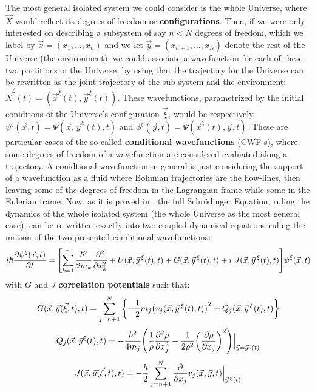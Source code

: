 \documentclass[11pt, a4paper]{article} %
\begin{document}
The most general isolated system we could consider is the whole Universe, where $\vec{X}$ would reflect its degrees of freedom or {\bf configurations}. Then, if we were only interested on describing a subsystem of say $n<N$ degrees of freedom, which we label by $\vec{x}=(x_1,...,x_n)$ and we let $\vec{y}=(x_{n+1},...,x_N)$ denote the rest of the Universe (the environment), we could associate a wavefunction for each of these two partitions of the Universe, by using that the trajectory for the Universe can be rewritten as the joint trajectory of the sub-system and the environment: $\vec{X}^\xi(t)=(\vec{x}^\xi(t), \vec{y}^\xi(t))$. These wavefunctions, parametrized by the initial coniditons of the Universe's configuration $\vec{\xi}$, would be respectively, $\psi^\xi(\vec{x},t)=\Psi(\vec{x},\vec{y}^\xi(t),t)$ and $\phi^\xi(\vec{y},t)=\Psi(\vec{x}^\xi(t),\vec{y},t)$. These are particular cases of the so called {\bf conditional wavefunctions} (CWF-s), where some degrees of freedom of a wavefunction are considered evaluated along a trajectory. A conidtional wavefunction in general is just considering the support of a wavefunction as a fluid where Bohmian trajectories are the flow-lines, then leaving some of the degrees of freedom in the Lagrangian frame while some in the Eulerian frame. Now, as it is proved in \cite{GJ}, the full Schrödinger Equation, ruling the dynamics of the whole isolated system (the whole Universe as the most general case), can be re-written exactly into two coupled dynamical equations ruling the motion of the two presented conditional wavefunctions:
\begin{equation}\label{SE.GJ}
i \hbar \pdv{\psi^\xi (\vec{x},t)}{t} = \qty[\sum_{k=1}^n\frac{\hbar^2}{2m_k} \pdv[2]{}{x_k} +  U(\vec{x}, \vec{y}^{\, \xi}(t),t) + G(\vec{x}, \vec{y}^{\, \xi}(t),t)+i\ J(\vec{x}, \vec{y}^{\, \xi}(t),t)] \psi^\xi (\vec{x},t)
\end{equation}
with $G$ and $J$ {\bf correlation potentials} such that:
\begin{equation}\label{G.Bohm}
G(\vec{x},\vec{y}(\vec{\xi},t),t)=\sum_{j=n+1}^N\qty{-\frac{1}{2}m_j\qty(v_j(\vec{x},\vec{y}^{\, \xi}(t),t))^2+Q_j(\vec{x},\vec{y}^{\, \xi}(t),t)}
\end{equation}
\begin{equation}\label{Q.Bohm}
Q_j(\vec{x}, \vec{y}^\xi(t),t) = -\frac{\hbar^2}{4m_j} \qty(\frac{1}{\rho}\pdv[2]{\rho}{x_j} -\frac{1}{2\rho^2}\qty(\pdv{\rho}{x_j})^2)\Big\rvert_{\vec{y}=\vec{y}^\xi(t)}
\end{equation}
\begin{equation}\label{J.Bohm}
J(\vec{x},\vec{y}(\vec{\xi},t),t)=-\frac{\hbar}{2}\sum_{j=n+1}^N\pdv{}{x_j}v_j(\vec{x},\vec{y},t)\Big\rvert_{\vec{y}^{\, \xi}(t)}
\end{equation}
\end{document}
